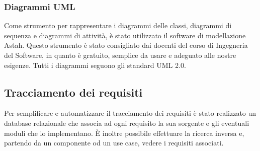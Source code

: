 \subsubsection{Diagrammi UML}
Come strumento per rappresentare i diagrammi delle classi, diagrammi di sequenza e diagrammi di attività, è stato utilizzato il software di modellazione Astah. Questo strumento è stato consigliato dai docenti del corso di Ingegneria del Software, in quanto è gratuito, semplice da usare e adeguato alle nostre esigenze. Tutti i diagrammi seguono gli standard UML 2.0.

\subsection{Tracciamento dei requisiti}
\label{}
Per semplificare e automatizzare il tracciamento dei requisiti è stato realizzato un database relazionale che associa ad ogni requisito la sua sorgente e gli eventuali moduli che lo implementano. È inoltre possibile effettuare la ricerca inversa e, partendo da un componente od un use case, vedere i requisiti associati.


\appendix
